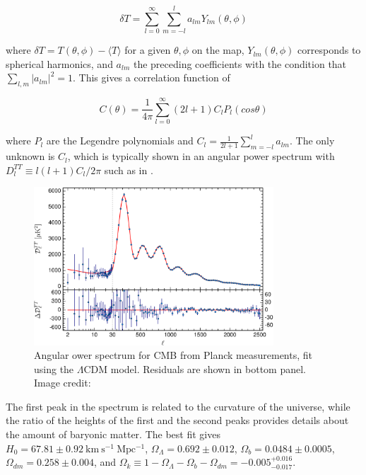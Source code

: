 \begin{equation}
\delta T = \sum\limits_{l=0}^{\infty} \sum\limits_{m=-l}^{l} a_{lm}Y_{lm}(\theta, \phi)
\end{equation}

\noindent where $\delta T = T(\theta, \phi) - \langle T \rangle$ for a given $\theta , \phi$
on the map, $Y_{lm}(\theta, \phi)$ corresponds to spherical harmonics, and $a_{lm}$ the preceding coefficients
with the condition that $\sum\limits_{l,m} |a_{lm}|^{2} = 1$.  This gives a correlation function of

\begin{equation}
C(\theta) = \frac{1}{4 \pi} \sum\limits_{l=0}^{\infty} (2l + 1) C_{l} P_{l}(cos \theta)
\end{equation}

\noindent where $P_{l}$ are the Legendre polynomials and $C_{l} = \frac{1}{2l + 1} \sum\limits_{m=-l}^{l} a_{lm}$.  The
only unknown is $C_{l}$, which is typically shown in an angular power spectrum with
$D_{l}^{TT} \equiv l(l+1)C_{l}/2\pi$ such as in .

\begin{figure}
	\includegraphics[width=0.8\textwidth]{cmb_power_spectrum}
	\centering
	\caption{Angular ower spectrum for CMB from Planck measurements, fit using the $\Lambda$CDM model.  Residuals
	are shown in bottom panel.  Image credit: }
	\label{fig:cmb_power_spectrum}
\end{figure}

The first peak in the spectrum is related to the curvature of the universe, while the ratio of the heights of the
first and the second peaks provides details about the amount of baryonic matter.  The best fit gives
$H_{0} = 67.81 \pm 0.92\ \mathrm{km\ s^{-1}\ Mpc^{-1}}$, $\Omega_{\Lambda} = 0.692 \pm 0.012$,
$\Omega_{b} = 0.0484 \pm 0.0005$, $\Omega_{dm} = 0.258 \pm 0.004$, and
$\Omega_{k} \equiv 1 - \Omega_{\Lambda} - \Omega_{b} - \Omega_{dm} =  -0.005_{-0.017}^{+0.016}$.


